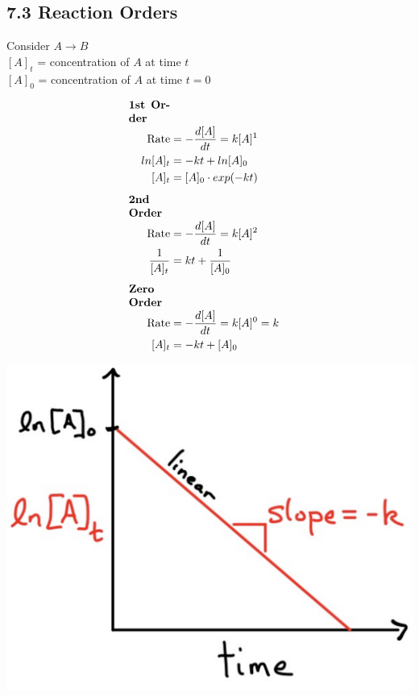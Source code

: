 \subsection{7.3 Reaction Orders}
\vspace*{0.2em}
Consider $A \longrightarrow B$\\
$[A]_t$ = concentration of $A$ at time $t$\\
$[A]_0$ = concentration of $A$ at time $t=0$

\vspace*{-1em}
\begin{minipage}{0.99\linewidth}
    \begin{minipage}{0.65\linewidth}
        \begin{align*}
            \parbox{1.3cm}{\textbf{1st Order}}\\
            \text{Rate} &= -\frac{d[A]}{d t} = k[A]^1 \\
            ln[A]_t &= -k t + ln[A]_0\\
            [A]_t& = [A]_0 \cdot exp(-k t)
            \\[0.5em]
            \parbox{1.3cm}{\textbf{2nd Order}}\\
            \text{Rate} &= -\frac{d[A]}{d t} = k[A]^2 \\
            \frac{1}{[A]_t} &= k t + \frac{1}{[A]_0}
            \\[0.5em]
            \parbox{1.3cm}{\textbf{Zero Order}}\\
            \text{Rate} &= -\frac{d[A]}{d t} = k[A]^0 = k \\
            [A]_t &= -k t + [A]_0 \\
        \end{align*}
    \end{minipage}
    \begin{minipage}{0.34\linewidth}
        \vspace{2.5em}

        \includegraphics[width=0.9\linewidth]{src/7_Kinetics/images/1st_order.pdf}


\end{minipage}
\end{minipage}
